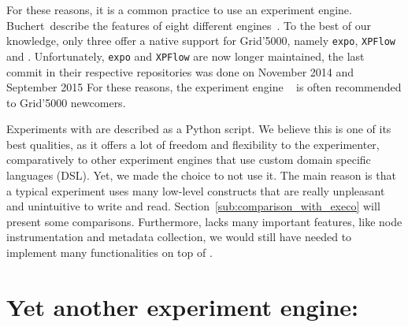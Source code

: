             For these reasons, it is a common practice to use an experiment engine. Buchert~\etal describe the features
            of eight different engines~\cite{buchert:hal-01087519}. To the best of our knowledge, only three offer a
            native support for Grid'5000, namely \texttt{expo}, \texttt{XPFlow} and \execo. Unfortunately, \texttt{expo}
            and \texttt{XPFlow} are now longer maintained, the last commit in their respective repositories was done on
            November 2014 and September 2015 For these reasons, the experiment engine \execo~\cite{Imbert_2013} is often
            recommended to Grid'5000 newcomers.

            Experiments with \execo are described as a Python script. We believe this is one of its best qualities, as it
            offers a lot of freedom and flexibility to the experimenter, comparatively to other experiment engines that
            use custom domain specific languages (DSL). Yet, we made the choice to not use it. The main reason is that a
            typical \execo experiment uses many low-level constructs that are really unpleasant and unintuitive to write
            and read. Section~\ref{sub:comparison_with_execo} will present some comparisons. Furthermore, \execo lacks
            many important features, like node instrumentation and metadata collection, \ie we would still have needed
            to implement many functionalities on top of \execo.

    \section{Yet another experiment engine: \peanut}%
    \label{sec:peanut}
